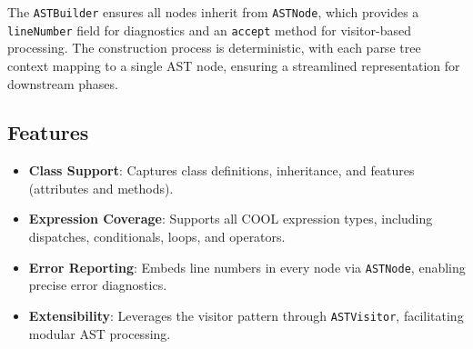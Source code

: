 \documentclass[11pt, titlepage]{article}
\begin{document}
The \texttt{ASTBuilder} ensures all nodes inherit from \texttt{ASTNode}, which provides a \texttt{lineNumber} field for diagnostics and an \texttt{accept} method for visitor-based processing. The construction process is deterministic, with each parse tree context mapping to a single AST node, ensuring a streamlined representation for downstream phases.

\subsection{Features}
\begin{itemize}[leftmargin=*]
    \item \textbf{Class Support}: Captures class definitions, inheritance, and features (attributes and methods).
    \item \textbf{Expression Coverage}: Supports all COOL expression types, including dispatches, conditionals, loops, and operators.
    \item \textbf{Error Reporting}: Embeds line numbers in every node via \texttt{ASTNode}, enabling precise error diagnostics.
    \item \textbf{Extensibility}: Leverages the visitor pattern through \texttt{ASTVisitor}, facilitating modular AST processing.
\end{itemize}
\end{document}
